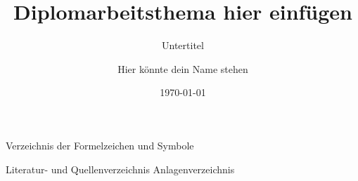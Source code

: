 %
%
%
%
%
\titlehead{\centering\texttt{[image: htw-logo]} } %
\subject{Diplomarbeit}
\title{Diplomarbeitsthema hier einfügen} %
\subtitle{Untertitel } %
\author{Hier könnte dein Name stehen} %
\date{\today } %
\publishers{Verlag }

\maketitle
\newpage
\tableofcontents
\newpage
\printnoidxglossaries
\newpage
Verzeichnis der Formelzeichen und Symbole
\newpage
\listoffigures
\newpage
\listoftables
\newpage
\cleardoubleoddpage
%
%
%
%
%
%
%
%
%
%
%
%
Literatur- und Quellenverzeichnis
\newpage
%
%
%
%
% 
Anlagenverzeichnis
\newpage
\appendix
\newpage
\newpage

%
%

